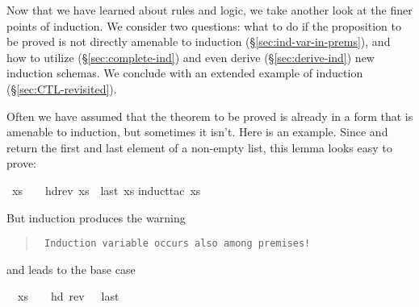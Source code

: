 %
\begin{isabellebody}%
\def\isabellecontext{AdvancedInd}%
%
\isadelimtheory
%
\endisadelimtheory
%
\isatagtheory
%
\endisatagtheory
{\isafoldtheory}%
%
\isadelimtheory
%
\endisadelimtheory
%
\begin{isamarkuptext}%
\noindent
Now that we have learned about rules and logic, we take another look at the
finer points of induction.  We consider two questions: what to do if the
proposition to be proved is not directly amenable to induction
(\S\ref{sec:ind-var-in-prems}), and how to utilize (\S\ref{sec:complete-ind})
and even derive (\S\ref{sec:derive-ind}) new induction schemas. We conclude
with an extended example of induction (\S\ref{sec:CTL-revisited}).%
\end{isamarkuptext}%
\isamarkuptrue%
%
\isamarkuptrue%
%
\begin{isamarkuptext}%
\label{sec:ind-var-in-prems}
Often we have assumed that the theorem to be proved is already in a form
that is amenable to induction, but sometimes it isn't.
Here is an example.
Since  and  return the first and last element of a
non-empty list, this lemma looks easy to prove:%
\end{isamarkuptext}%
\isamarkuptrue%
\isamarkupfalse%
\ {}xs\ {}\ {}{}\ {}\ hd{}rev\ xs{}\ {}\ last\ xs{}\isanewline
%
\isadelimproof
%
\endisadelimproof
%
\isatagproof
{}\isamarkupfalse%
{}induct{}tac\ xs{}%
\begin{isamarkuptxt}%
\noindent
But induction produces the warning
\begin{quote}\tt
Induction variable occurs also among premises!
\end{quote}
and leads to the base case
\begin{isabelle}%
\ {}{}\ xs\ {}\ {}{}\ {}\ hd\ {}rev\ {}{}{}\ {}\ last\ {}{}%

\end{isabelle}
\end{isamarkuptxt}
\end{isabellebody}
